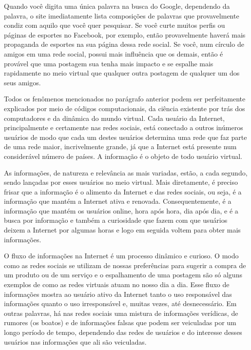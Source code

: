 \documentclass[
	12pt,				%
	openright,			%
	oneside,			%
	a4paper,			%
	english,			%
	french,				%
	spanish,			%
	brazil				%
	]{abntex2}
\begin{document}
Quando você digita uma única palavra na busca do Google, dependendo da
palavra, o site imediatamente lista composições de palavras que
provavelmente condiz com aquilo que você quer pesquisar. Se você curte
muitos perfis ou páginas de esportes no Facebook, por exemplo, então
provavelmente haverá mais propaganda de esportes na sua página dessa
rede social. Se você, num círculo de amigos em uma rede social, possui
mais influência que os demais, então é provável que uma postagem sua
tenha mais impacto e se espalhe mais rapidamente no meio virtual que
qualquer outra postagem de qualquer um dos seus amigos.

Todos os fenômenos mencionados no parágrafo anterior podem ser
perfeitamente explicados por meio de códigos computacionais, da
ciência existente por trás dos computadores e da dinâmica do mundo
virtual. Cada usuário da Internet, principalmente e certamente nas
redes sociais, está conectado a outros inúmeros usuários de modo que
cada um destes usuários determina uma rede que faz parte de uma rede
maior, incrivelmente grande, já que a Internet está presente num
considerável número de países. A informação é o objeto de todo usuário
virtual.

As informações, de natureza e relevância as mais variadas, estão, a
cada segundo, sendo lançadas por esses usuários no meio virtual. Mais
diretamente, é preciso frisar que a informação é o alimento da
Internet e das redes sociais, ou seja, é a informação que mantém a
Internet ativa e renovada. Consequentemente, é a informação que mantém
os usuários online, hora após hora, dia após dia, e é a busca por
informação e também a curiosidade que fazem com que usuários deixem a
Internet por algumas horas e logo em seguida voltem para obter mais
informações.

O fluxo de informações na Internet é um processo dinâmico e curioso. O
modo como as redes sociais se utilizam de nossas preferências para
sugerir a compra de um produto ou de um serviço e o espalhamento de
uma postagem são só alguns exemplos de como as redes virtuais atuam no
nosso dia a dia. Esse fluxo de informações mostra ao usuário ativo da
Internet tanto o uso responsável das informações quanto o uso
irresponsável e, muitas vezes, até desnecessário. Em outras palavras,
há nas redes sociais uma mistura de informações verídicas, de rumores
(os boatos) e de informações falsas que podem ser veiculadas por um
longo período de tempo, dependendo das redes de usuários e do
interesse desses usuários nas informações que ali são veiculadas.
\end{document}
